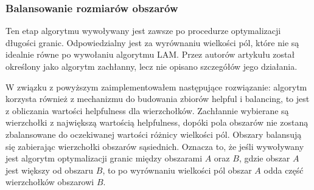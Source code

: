 \subsubsection{Balansowanie rozmiarów obszarów}
Ten etap algorytmu wywoływany jest zawsze po procedurze optymalizacji długości granic.
Odpowiedzialny jest za wyrównaniu wielkości pól, które nie są idealnie równe po
wywołaniu algorytmu LAM.
Przez autorów artykułu \cite{1364754} został określony jako algorytm zachłanny, lecz nie opisano szczegółów jego działania.

W związku z powyższym zaimplementowałem następujące rozwiązanie:
algorytm korzysta również z mechanizmu do budowania zbiorów helpful i balancing, to jest z obliczania wartości
helpfulness dla wierzchołków.
Zachłannie wybierane są wierzchołki z największą wartością helpfulness, dopóki pola obszarów nie zostaną
zbalansowane do oczekiwanej wartości różnicy wielkości pól.
Obszary balansują się zabierając wierzchołki obszarów sąsiednich.
Oznacza to, że jeśli wywoływany jest algorytm optymalizacji granic między obszarami $A$ oraz $B$, gdzie obszar $A$
jest większy od obszaru $B$, to po wyrównaniu wielkości pól obszar $A$ odda część wierzchołków obszarowi $B$.


